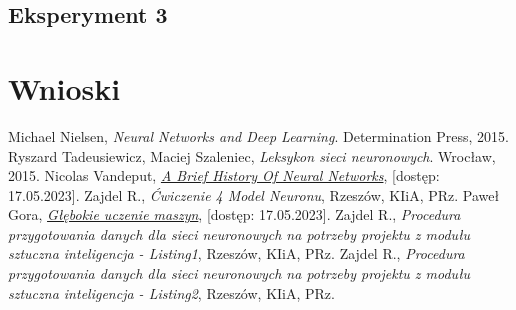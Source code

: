 \documentclass{article}
\begin{document}
\subsection{Eksperyment 3}
\section{Wnioski}
\begin{thebibliography}{9}
    Michael Nielsen,
    \emph{Neural Networks and Deep Learning}.
    Determination Press,
    2015.
    Ryszard Tadeusiewicz, Maciej Szaleniec,
    \emph{Leksykon sieci neuronowych}.
    Wrocław,
    2015.
    Nicolas Vandeput,
    \href{https://medium.com/analytics-vidhya/a-brief-history-of-neural-networks-c234639a43f1}{\emph{A Brief History Of Neural Networks}},
    [dostęp: 17.05.2023].
    Zajdel R.,
    \emph{Ćwiczenie 4 Model Neuronu},
    Rzeszów,
    KIiA, PRz.
    Paweł Gora,
    \href{https://www.deltami.edu.pl/temat/informatyka/sztuczna_inteligencja/2017/12/28/Glebokie_uczenie_maszyn/}{\emph{Głębokie uczenie maszyn}},
    [dostęp: 17.05.2023].
    Zajdel R.,
    \emph{Procedura przygotowania danych dla sieci neuronowych na potrzeby projektu z modułu sztuczna inteligencja - Listing1},
    Rzeszów,
    KIiA, PRz.
    Zajdel R.,
    \emph{Procedura przygotowania danych dla sieci neuronowych na potrzeby projektu z modułu sztuczna inteligencja - Listing2},
    Rzeszów,
    KIiA, PRz.
\end{thebibliography}
\end{document}
